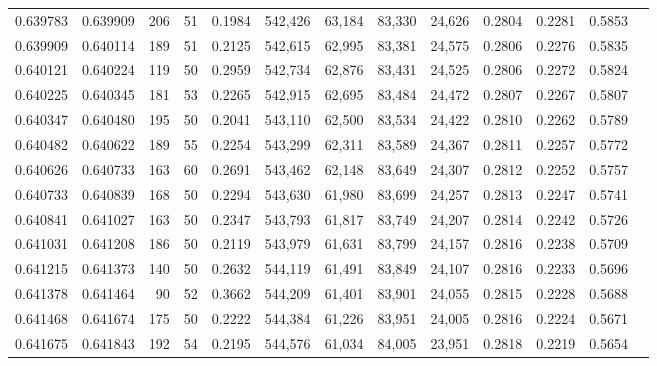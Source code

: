 \begin{tabular}{rrrrrrrrrrrrr}
0.639783 & 0.639909 &   206 &  51 &                                     0.1984 & 542,426 &  63,184 &  83,330 &  24,626 & 0.2804 & 0.2281 & 0.5853 \\
0.639909 & 0.640114 &   189 &  51 &                                     0.2125 & 542,615 &  62,995 &  83,381 &  24,575 & 0.2806 & 0.2276 & 0.5835 \\
0.640121 & 0.640224 &   119 &  50 &                                     0.2959 & 542,734 &  62,876 &  83,431 &  24,525 & 0.2806 & 0.2272 & 0.5824 \\
0.640225 & 0.640345 &   181 &  53 &                                     0.2265 & 542,915 &  62,695 &  83,484 &  24,472 & 0.2807 & 0.2267 & 0.5807 \\
0.640347 & 0.640480 &   195 &  50 &                                     0.2041 & 543,110 &  62,500 &  83,534 &  24,422 & 0.2810 & 0.2262 & 0.5789 \\
0.640482 & 0.640622 &   189 &  55 &                                     0.2254 & 543,299 &  62,311 &  83,589 &  24,367 & 0.2811 & 0.2257 & 0.5772 \\
0.640626 & 0.640733 &   163 &  60 &                                     0.2691 & 543,462 &  62,148 &  83,649 &  24,307 & 0.2812 & 0.2252 & 0.5757 \\
0.640733 & 0.640839 &   168 &  50 &                                     0.2294 & 543,630 &  61,980 &  83,699 &  24,257 & 0.2813 & 0.2247 & 0.5741 \\
0.640841 & 0.641027 &   163 &  50 &                                     0.2347 & 543,793 &  61,817 &  83,749 &  24,207 & 0.2814 & 0.2242 & 0.5726 \\
0.641031 & 0.641208 &   186 &  50 &                                     0.2119 & 543,979 &  61,631 &  83,799 &  24,157 & 0.2816 & 0.2238 & 0.5709 \\
0.641215 & 0.641373 &   140 &  50 &                                     0.2632 & 544,119 &  61,491 &  83,849 &  24,107 & 0.2816 & 0.2233 & 0.5696 \\
0.641378 & 0.641464 &    90 &  52 &                                     0.3662 & 544,209 &  61,401 &  83,901 &  24,055 & 0.2815 & 0.2228 & 0.5688 \\
0.641468 & 0.641674 &   175 &  50 &                                     0.2222 & 544,384 &  61,226 &  83,951 &  24,005 & 0.2816 & 0.2224 & 0.5671 \\
0.641675 & 0.641843 &   192 &  54 &                                     0.2195 & 544,576 &  61,034 &  84,005 &  23,951 & 0.2818 & 0.2219 & 0.5654 \\

\end{tabular}
